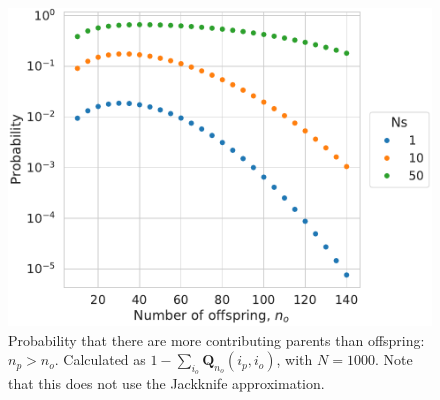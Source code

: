 \documentclass[review,nonatbib]{elsarticle}
\begin{document}
\begin{figure}[H]
  \centering
  \includegraphics[width=\textwidth]{fig/missing.pdf}

  \caption{Probability that there are more contributing parents than offspring: $n_p > n_o$.
    Calculated as $1-\sum_{i_o} \mathbf{Q}_{n_o}{(i_p, i_o)}$, with $N=1000$. Note that this does
    not use the Jackknife approximation.}

  \label{fig_apx_missing}
\end{figure}


\end{document}
